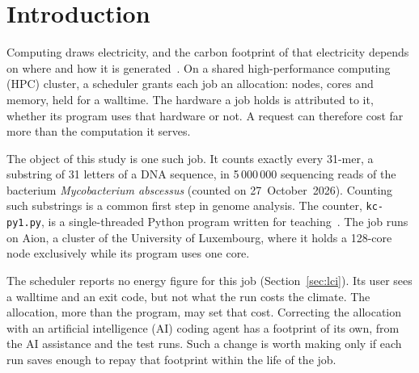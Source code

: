 \documentclass[conference,a4paper]{IEEEtran}
\newif\ifguidance
\newcommand{\guidance}[1]{\ifguidance{\itshape\small #1\par\medskip}\fi}
\begin{document}
\guidance{Every italic note in this document is guidance.
Delete each one as you write its section, then set
\texttt{\textbackslash guidancefalse} in the preamble: the PDF you submit
carries no guidance. The notes add pages, so that switch is also how you check
whether you have reached the required length.}

\guidance{Keep the first half of the title above, which names the job you
assessed. Adapt the second half to your own finding: once you hold your payback
figure, rewrite it around that. A title that states a finding carries further
than one that states a topic.}

\guidance{Your paper is reviewed double-blind. Two classmates receive it with
the author block blanked, with Appendix B removed, and with the repository
replaced by an archive holding only the script, its README and the LICENSE
with the name neutralised. Your reviewers may be working on a web page rather
than on a job, so every convention your paper runs on is stated in the paper.}


\section{Introduction}\label{sec:intro}
Computing draws electricity, and the carbon footprint of that electricity
depends on where and how it is generated~\cite{lannelongue2021}. On a shared
high-performance computing (HPC) cluster, a scheduler grants each job an
allocation: nodes, cores and memory, held for a walltime. The hardware a job
holds is attributed to it, whether its program uses that hardware or not. A
request can therefore cost far more than the computation it serves.

The object of this study is one such job. It counts exactly every 31-mer, a
substring of 31 letters of a DNA sequence, in 5\,000\,000 sequencing reads of
the bacterium \emph{Mycobacterium abscessus} (counted on 27~October~2026).
Counting such substrings is a common first step in genome analysis. The
counter, \texttt{kc-py1.py}, is a single-threaded Python program written for
teaching~\cite{kmercnt}. The job runs on Aion, a cluster of the University of
Luxembourg, where it holds a 128-core node exclusively while its program uses
one core.

The scheduler reports no energy figure for this job (Section~\ref{sec:lci}).
Its user sees a walltime and an exit code, but not what the run costs the
climate. The allocation, more than the program, may set that cost. Correcting
the allocation with an artificial intelligence (AI) coding agent has a
footprint of its own, from the AI assistance and the test runs. Such a change is
worth making only if each run saves enough to repay that footprint within the
life of the job.
\end{document}
